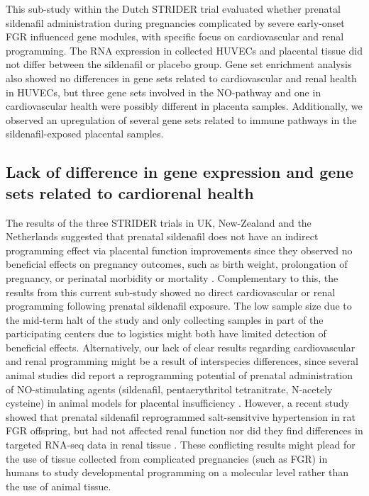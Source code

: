\documentclass[authordate, empirical]{jote-new-article}
\begin{document}
This sub-study within the Dutch STRIDER trial evaluated whether prenatal sildenafil administration during pregnancies complicated by severe early-onset FGR influenced gene modules, with specific focus on cardiovascular and renal programming. The RNA expression in collected HUVECs and placental tissue did not differ between the sildenafil or placebo group. Gene set enrichment analysis also showed no differences in gene sets related to cardiovascular and renal health in HUVECs, but three gene sets involved in the NO-pathway and one in cardiovascular health were possibly different in placenta samples. Additionally, we observed an upregulation of several gene sets related to immune pathways in the sildenafil-exposed placental samples.







\subsection{Lack of difference in gene expression and gene sets related to cardiorenal health}



The results of the three STRIDER trials in UK, New-Zealand and the Netherlands suggested that prenatal sildenafil does not have an indirect programming effect via placental function improvements since they observed no beneficial effects on pregnancy outcomes, such as birth weight, prolongation of pregnancy, or perinatal morbidity or mortality \parencites{Groom2019}{Sharp2018}{Pels2020}. Complementary to this, the results from this current sub-study showed no direct cardiovascular or renal programming following prenatal sildenafil exposure. The low sample size due to the mid-term halt of the study and only collecting samples in part of the participating centers due to logistics might both have limited detection of beneficial effects. Alternatively, our lack of clear results regarding cardiovascular and renal programming might be a result of interspecies differences, since several animal studies did report a reprogramming potential of prenatal administration of NO-stimulating agents (sildenafil, pentaerythritol tetranitrate, N-acetely cysteine) in animal models for placental insufficiency \parencites{Herrera2017}{Itani2017}{Wu2015}. However, a recent study showed that prenatal sildenafil reprogrammed salt-sensitvive hypertension in rat FGR offspring, but had not affected renal function nor did they find differences in targeted RNA-seq data in renal tissue \parencites{Turbeville2020}. These conflicting results might plead for the use of tissue collected from complicated pregnancies (such as FGR) in humans to study developmental programming on a molecular level rather than the use of animal tissue.
\end{document}
